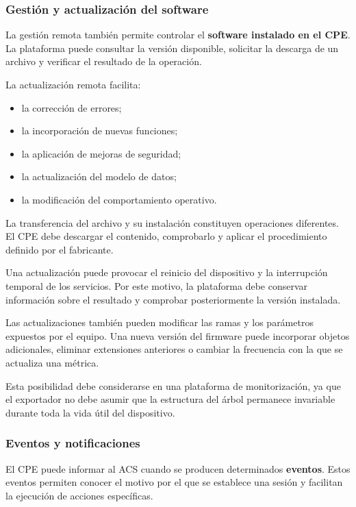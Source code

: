 \subsubsection*{Gestión y actualización del software}

La gestión remota también permite controlar el
\textbf{software instalado en el CPE}. La plataforma puede consultar la
versión disponible, solicitar la descarga de un archivo y verificar el
resultado de la operación.

La actualización remota facilita:

\begin{itemize}
    \item la corrección de errores;
    \item la incorporación de nuevas funciones;
    \item la aplicación de mejoras de seguridad;
    \item la actualización del modelo de datos;
    \item la modificación del comportamiento operativo.
\end{itemize}

La transferencia del archivo y su instalación constituyen operaciones
diferentes. El CPE debe descargar el contenido, comprobarlo y aplicar el
procedimiento definido por el fabricante.

Una actualización puede provocar el reinicio del dispositivo y la
interrupción temporal de los servicios. Por este motivo, la plataforma
debe conservar información sobre el resultado y comprobar posteriormente
la versión instalada.

Las actualizaciones también pueden modificar las ramas y los parámetros
expuestos por el equipo. Una nueva versión del firmware puede incorporar
objetos adicionales, eliminar extensiones anteriores o cambiar la
frecuencia con la que se actualiza una métrica.

Esta posibilidad debe considerarse en una plataforma de monitorización,
ya que el exportador no debe asumir que la estructura del árbol permanece
invariable durante toda la vida útil del dispositivo.


\subsubsection*{Eventos y notificaciones}

El CPE puede informar al ACS cuando se producen determinados
\textbf{eventos}. Estos eventos permiten conocer el motivo por el que se
establece una sesión y facilitan la ejecución de acciones específicas.

